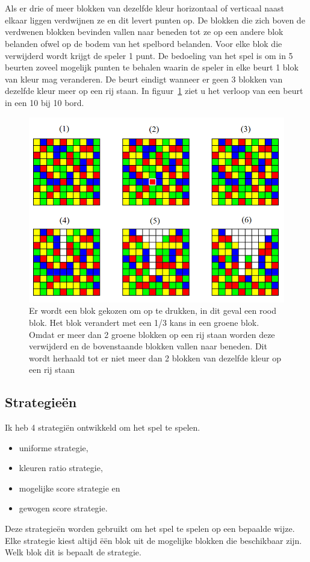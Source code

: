 \documentclass[12pt,a4paper,oneside]{book}
\theoremstyle{definition}
\begin{document}
\renewcommand{\arraystretch}{1}
\\\\
Als er drie of meer blokken van dezelfde kleur horizontaal of verticaal naast elkaar liggen verdwijnen ze en dit levert punten op. De blokken die zich boven de verdwenen blokken bevinden vallen naar beneden tot ze op een andere blok belanden ofwel op de bodem van het spelbord belanden. Voor elke blok die verwijderd wordt krijgt de speler 1 punt. De bedoeling van het spel is om in 5 beurten zoveel mogelijk punten te behalen waarin de speler in elke beurt 1 blok van kleur mag veranderen. De beurt eindigt wanneer er geen 3 blokken van dezelfde kleur meer op een rij staan. In figuur~\ref{figure:boardturn} ziet u het verloop van een beurt in een 10 bij 10 bord.
\begin{figure}
	\centering
	\includegraphics[height=80truemm]{turn}
	\caption{Er wordt een blok gekozen om op te drukken, in dit geval een rood blok. Het blok verandert met een 1/3 kans in een groene blok. Omdat er meer dan 2 groene blokken op een rij staan worden deze verwijderd en de bovenstaande blokken vallen naar beneden. Dit wordt herhaald tot er niet meer dan 2 blokken van dezelfde kleur op een rij staan}
	\label{figure:boardturn}
\end{figure}
\subsection{Strategie\"{e}n}
Ik heb 4 strategiën ontwikkeld om het spel te spelen.
\begin{itemize}
	\item uniforme strategie,
	\item kleuren ratio strategie,
	\item mogelijke score strategie en
	\item gewogen score strategie.
\end{itemize}
Deze strategie\"{e}n worden gebruikt om het spel te spelen op een bepaalde wijze. Elke strategie kiest altijd \"{e}\"{e}n blok uit de mogelijke blokken die beschikbaar zijn. Welk blok dit is bepaalt de strategie.
\end{document}
